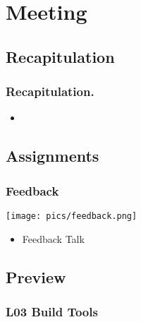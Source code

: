 %


\section{Meeting}

\subsection{Recapitulation}

\begin{frame}
	\frametitle{Recapitulation.}
	\begin{itemize}
		\item 
	\end{itemize}
\end{frame}

\subsection{Assignments}

\begin{frame}
	\frametitle{Feedback}

	\hfill \texttt{[image: pics/feedback.png]}
	\vspace{-1cm}
	\begin{itemize}
		\item Feedback Talk
	\end{itemize}
\end{frame}

\subsection{Preview}

\begin{frame}
	\frametitle{L03 Build Tools}
\end{frame}



\nocite{raab2017introducing}

\appendix

\begin{frame}[allowframebreaks]
	
	
\end{frame}




